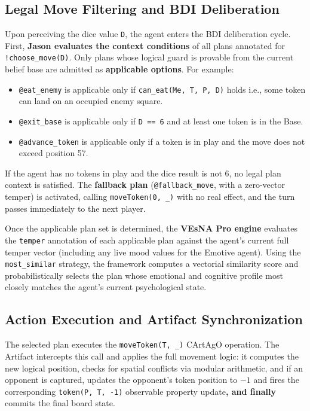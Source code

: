 \documentclass[12pt]{article}
\begin{document}
\subsection{Legal Move Filtering and BDI Deliberation}
\label{subsec:bdi_eval}
\noindent Upon perceiving the dice value \texttt{D}, the agent enters the BDI
deliberation cycle. First, \textbf{Jason evaluates the context conditions} of
all plans annotated for \texttt{!choose\_move(D)}. Only plans whose logical
guard is provable from the current belief base are admitted as \textbf{applicable
options}. For example:

\begin{itemize}
    \item \texttt{@eat\_enemy} is applicable only if \texttt{can\_eat(Me, T, P, D)}
    holds i.e., some token can land on an occupied enemy square.
    \item \texttt{@exit\_base} is applicable only if \texttt{D == 6} and at
    least one token is in the Base.
    \item \texttt{@advance\_token} is applicable only if a token is in play and
    the move does not exceed position 57.
\end{itemize}

\noindent If the agent has no tokens in play and the dice result is not 6, no
legal plan context is satisfied. The \textbf{fallback plan} (\texttt{@fallback\_move},
with a zero-vector temper) is activated, calling \texttt{moveToken(0, \_)} with no
real effect, and the turn passes immediately to the next player.

\noindent Once the applicable plan set is determined, the \textbf{VEsNA Pro engine}
evaluates the \texttt{temper} annotation of each applicable plan against the
agent's current full temper vector (including any live mood values for the Emotive
agent). Using the \texttt{most\_similar} strategy, the framework computes a
vectorial similarity score and probabilistically selects the plan whose emotional
and cognitive profile most closely matches the agent's current psychological state.

\subsection{Action Execution and Artifact Synchronization}
\label{subsec:action_exec}
\noindent The selected plan executes the \texttt{moveToken(T, \_)} CArtAgO
operation. The Artifact intercepts this call and applies the full movement logic:
it computes the new logical position, checks for spatial conflicts via
modular arithmetic, and if an opponent is captured, updates the opponent's token
position to $-1$ and fires the corresponding \texttt{token(P, T, -1)} observable
property update\textbf{, and finally} commits the final board state.
\end{document}
